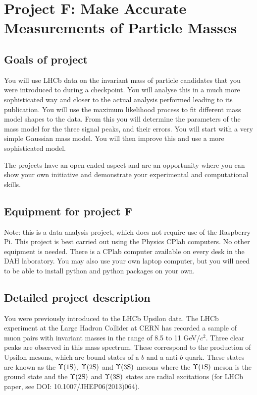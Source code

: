 
 
 
 
\newpage
\section{Project F: Make Accurate Measurements of Particle Masses}

\subsection{Goals of project}

You will use LHCb data on the invariant mass of particle candidates that you were introduced to during a checkpoint. You will analyse this in a much more sophisticated way and closer to the actual analysis performed leading to its publication. You will use the maximum likelihood process to fit different mass model shapes to the data. From this you will determine the parameters of the mass model for the three signal peaks, and their errors. You will start with a very simple Gaussian mass model. You will then improve this and use a more sophisticated model.

The projects have an open-ended aspect and are an opportunity where you can show your own initiative and demonstrate your experimental and computational skills. 

\subsection{Equipment for project F}

Note: this is a data analysis project, which does not require use of the Raspberry Pi.
This project is best carried out using the Physics CPlab computers. No other equipment is needed.  There is a CPlab computer available on every desk in the DAH laboratory.
You may also use your own laptop computer, but you will need to be able to install
python and python packages on your own. 


\subsection{Detailed project description}
  
You were previously introduced to the LHCb Upsilon data. 
The LHCb experiment at the Large Hadron Collider at CERN has recorded a sample of muon pairs with invariant masses in the range of 8.5 to 11 GeV/$c^2$. Three clear peaks are observed in this mass spectrum. These correspond to the production of Upsilon mesons, which are bound states of a $b$ and a anti-$b$ quark. These states are known as the $\Upsilon \rm (1S)$, $\Upsilon \rm (2S)$ and $\Upsilon \rm (3S)$ mesons where the $\Upsilon \rm (1S)$ meson is the ground state and the $\Upsilon \rm (2S)$  and $\Upsilon \rm (3S)$  states are radial excitations (for LHCb paper, see {DOI: 10.1007/JHEP06(2013)064).}



